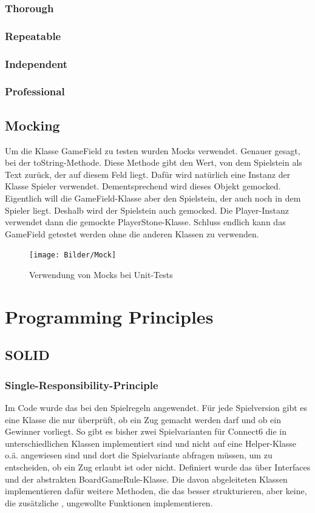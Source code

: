 \documentclass[12pt]{article}
\begin{document}
\subsubsection{Thorough}
\subsubsection{Repeatable}
\subsubsection{Independent}
\subsubsection{Professional}


\subsection{Mocking}
Um die Klasse GameField zu testen wurden Mocks verwendet. Genauer gesagt, bei der toString-Methode. Diese Methode gibt den Wert, von dem Spielstein als Text zurück, der auf diesem Feld liegt. Dafür wird natürlich eine Instanz der Klasse Spieler verwendet. Dementsprechend wird dieses Objekt gemocked. Eigentlich will die GameField-Klasse aber den Spielstein, der auch noch in dem Spieler liegt. Deshalb wird der Spielstein auch gemocked. Die Player-Instanz verwendet dann die gemockte PlayerStone-Klasse. Schluss endlich kann das GameField getestet werden ohne die anderen Klassen zu verwenden.


\begin{figure}[H]
\centering
{\texttt{[image: Bilder/Mock]}}
\caption{Verwendung von Mocks bei Unit-Tests}
\label{fig:Mock}
\end{figure}




\newpage
\section{Programming Principles}



\subsection{SOLID}


\subsubsection{Single-Responsibility-Principle}
Im Code wurde das bei den Spielregeln angewendet. Für jede Spielversion gibt es eine Klasse die nur überprüft, ob ein Zug gemacht werden darf und ob ein Gewinner vorliegt. So gibt es bisher zwei Spielvarianten für Connect6 die in unterschiedlichen Klassen implementiert sind und nicht auf eine Helper-Klasse o.ä. angewiesen sind und dort die Spielvariante abfragen müssen, um zu entscheiden, ob ein Zug erlaubt ist oder nicht. Definiert wurde das über Interfaces und der abstrakten BoardGameRule-Klasse. Die davon abgeleiteten Klassen implementieren dafür weitere Methoden, die das besser strukturieren, aber keine, die zusätzliche , ungewollte Funktionen implementieren.
\end{document}
